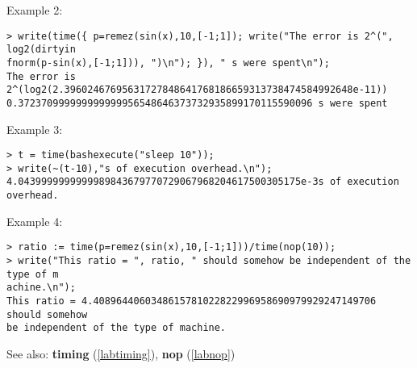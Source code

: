 \noindent Example 2: 
\begin{center}\begin{minipage}{15cm}\begin{Verbatim}[frame=single]
> write(time({ p=remez(sin(x),10,[-1;1]); write("The error is 2^(", log2(dirtyin
fnorm(p-sin(x),[-1;1])), ")\n"); }), " s were spent\n");
The error is 2^(log2(2.39602467695631727848641768186659313738474584992648e-11))
0.372370999999999999956548646373732935899170115590096 s were spent
\end{Verbatim}
\end{minipage}\end{center}
\noindent Example 3: 
\begin{center}\begin{minipage}{15cm}\begin{Verbatim}[frame=single]
> t = time(bashexecute("sleep 10"));
> write(~(t-10),"s of execution overhead.\n");
4.0439999999999989843679770729067968204617500305175e-3s of execution overhead.
\end{Verbatim}
\end{minipage}\end{center}
\noindent Example 4: 
\begin{center}\begin{minipage}{15cm}\begin{Verbatim}[frame=single]
> ratio := time(p=remez(sin(x),10,[-1;1]))/time(nop(10));
> write("This ratio = ", ratio, " should somehow be independent of the type of m
achine.\n");
This ratio = 4.4089644060348615781022822996958690979929247149706 should somehow 
be independent of the type of machine.
\end{Verbatim}
\end{minipage}\end{center}
See also: \textbf{timing} (\ref{labtiming}), \textbf{nop} (\ref{labnop})
